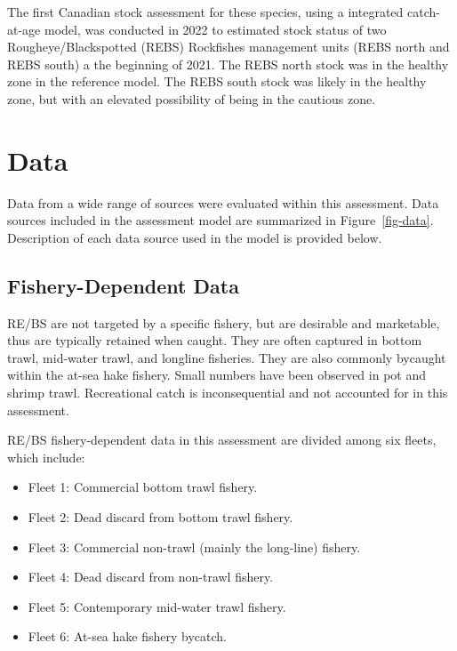 \documentclass[
]{scrartcl}
\providecommand{\tightlist}{%
  \setlength{\itemsep}{0pt}\setlength{\parskip}{0pt}}\usepackage{longtable,booktabs,array}
\begin{document}
The first Canadian stock assessment for these species, using a
integrated catch-at-age model, was conducted in 2022 to estimated stock
status of two Rougheye/Blackspotted (REBS) Rockfishes management units
(REBS north and REBS south) a the beginning of 2021. The REBS north
stock was in the healthy zone in the reference model. The REBS south
stock was likely in the healthy zone, but with an elevated possibility
of being in the cautious zone.

\newpage{}

\section{Data}\label{data}

Data from a wide range of sources were evaluated within this assessment.
Data sources included in the assessment model are summarized in
Figure~\ref{fig-data}. Description of each data source used in the model
is provided below.

\subsection{Fishery-Dependent Data}\label{sec-fishery_data}

RE/BS are not targeted by a specific fishery, but are desirable and
marketable, thus are typically retained when caught. They are often
captured in bottom trawl, mid-water trawl, and longline fisheries. They
are also commonly bycaught within the at-sea hake fishery. Small numbers
have been observed in pot and shrimp trawl. Recreational catch is
inconsequential and not accounted for in this assessment.

RE/BS fishery-dependent data in this assessment are divided among six
fleets, which include:

\begin{itemize}
\tightlist
\item
  Fleet 1: Commercial bottom trawl fishery.
\item
  Fleet 2: Dead discard from bottom trawl fishery.
\item
  Fleet 3: Commercial non-trawl (mainly the long-line) fishery.
\item
  Fleet 4: Dead discard from non-trawl fishery.
\item
  Fleet 5: Contemporary mid-water trawl fishery.
\item
  Fleet 6: At-sea hake fishery bycatch.
\end{itemize}
\end{document}
